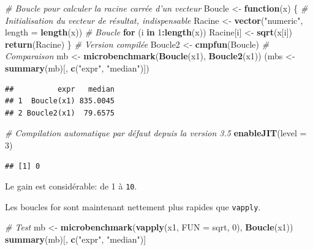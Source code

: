 \documentclass[
  12pt,
  french,
  a4paper,
  extrafontsizes,onecolumn,openright
  ]{memoir}
\newenvironment{Shaded}{\begin{snugshade}}{\end{snugshade}}
\newcommand{\CommentTok}[1]{\textcolor[rgb]{0.56,0.35,0.01}{\textit{#1}}}
\newcommand{\ControlFlowTok}[1]{\textcolor[rgb]{0.13,0.29,0.53}{\textbf{#1}}}
\newcommand{\DataTypeTok}[1]{\textcolor[rgb]{0.13,0.29,0.53}{#1}}
\newcommand{\DecValTok}[1]{\textcolor[rgb]{0.00,0.00,0.81}{#1}}
\newcommand{\KeywordTok}[1]{\textcolor[rgb]{0.13,0.29,0.53}{\textbf{#1}}}
\newcommand{\NormalTok}[1]{#1}
\newcommand{\OperatorTok}[1]{\textcolor[rgb]{0.81,0.36,0.00}{\textbf{#1}}}
\newcommand{\StringTok}[1]{\textcolor[rgb]{0.31,0.60,0.02}{#1}}
\begin{document}
\begin{Shaded}
\begin{Highlighting}[]
\CommentTok{# Boucle pour calculer la racine carrée d'un vecteur}
\NormalTok{Boucle <-}\StringTok{ }\ControlFlowTok{function}\NormalTok{(x) \{}
    \CommentTok{# Initialisation du vecteur de résultat, indispensable}
\NormalTok{    Racine <-}\StringTok{ }\KeywordTok{vector}\NormalTok{(}\StringTok{"numeric"}\NormalTok{, }\DataTypeTok{length =} \KeywordTok{length}\NormalTok{(x))}
    \CommentTok{# Boucle}
    \ControlFlowTok{for}\NormalTok{ (i }\ControlFlowTok{in} \DecValTok{1}\OperatorTok{:}\KeywordTok{length}\NormalTok{(x)) Racine[i] <-}\StringTok{ }\KeywordTok{sqrt}\NormalTok{(x[i])}
    \KeywordTok{return}\NormalTok{(Racine)}
\NormalTok{\}}
\CommentTok{# Version compilée}
\NormalTok{Boucle2 <-}\StringTok{ }\KeywordTok{cmpfun}\NormalTok{(Boucle)}
\CommentTok{# Comparaison}
\NormalTok{mb <-}\StringTok{ }\KeywordTok{microbenchmark}\NormalTok{(}\KeywordTok{Boucle}\NormalTok{(x1), }\KeywordTok{Boucle2}\NormalTok{(x1))}
\NormalTok{(mbs <-}\StringTok{ }\KeywordTok{summary}\NormalTok{(mb)[, }\KeywordTok{c}\NormalTok{(}\StringTok{"expr"}\NormalTok{, }\StringTok{"median"}\NormalTok{)])}
\end{Highlighting}
\end{Shaded}

\begin{verbatim}
##          expr   median
## 1  Boucle(x1) 835.0045
## 2 Boucle2(x1)  79.6575
\end{verbatim}

\begin{Shaded}
\begin{Highlighting}[]
\CommentTok{# Compilation automatique par défaut depuis la version 3.5}
\KeywordTok{enableJIT}\NormalTok{(}\DataTypeTok{level =} \DecValTok{3}\NormalTok{)}
\end{Highlighting}
\end{Shaded}

\begin{verbatim}
## [1] 0
\end{verbatim}

\normalsize
Le gain est considérable: de 1 à \texttt{10}.

Les boucles for sont maintenant nettement plus rapides que \texttt{vapply}.

\scriptsize

\begin{Shaded}
\begin{Highlighting}[]
\CommentTok{# Test}
\NormalTok{mb <-}\StringTok{ }\KeywordTok{microbenchmark}\NormalTok{(}\KeywordTok{vapply}\NormalTok{(x1, }\DataTypeTok{FUN =}\NormalTok{ sqrt, }\DecValTok{0}\NormalTok{), }\KeywordTok{Boucle}\NormalTok{(x1))}
\KeywordTok{summary}\NormalTok{(mb)[, }\KeywordTok{c}\NormalTok{(}\StringTok{"expr"}\NormalTok{, }\StringTok{"median"}\NormalTok{)]}
\end{Highlighting}
\end{Shaded}
\end{document}
